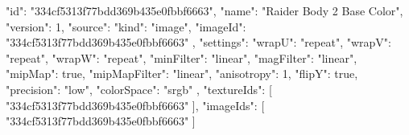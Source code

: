 {
  "id": "334cf5313f77bdd369b435e0fbbf6663",
  "name": "Raider Body 2 Base Color",
  "version": 1,
  "source": {
    "kind": "image",
    "imageId": "334cf5313f77bdd369b435e0fbbf6663"
  },
  "settings": {
    "wrapU": "repeat",
    "wrapV": "repeat",
    "wrapW": "repeat",
    "minFilter": "linear",
    "magFilter": "linear",
    "mipMap": true,
    "mipMapFilter": "linear",
    "anisotropy": 1,
    "flipY": true,
    "precision": "low",
    "colorSpace": "srgb"
  },
  "textureIds": [
    "334cf5313f77bdd369b435e0fbbf6663"
  ],
  "imageIds": [
    "334cf5313f77bdd369b435e0fbbf6663"
  ]
}
